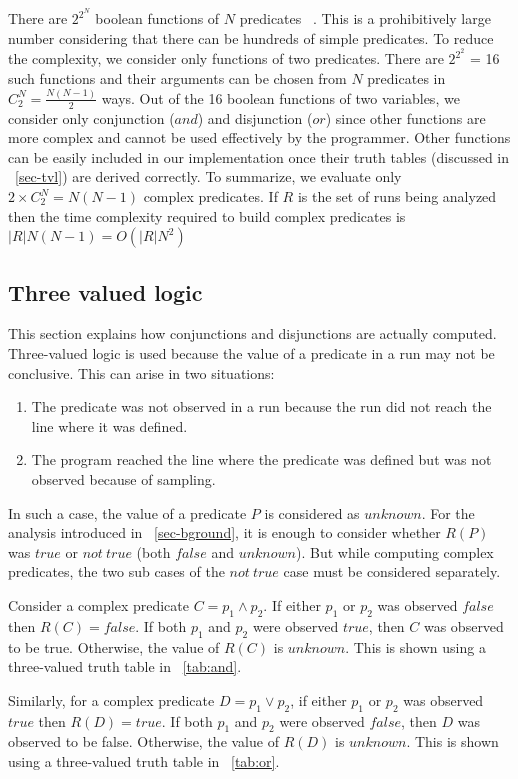 There are $2^{2^N}$ boolean functions of $N$ predicates ~\cite{MathWorld:BoolFuncs}.  This is a prohibitively large number considering that there can be hundreds of simple predicates.  To reduce the complexity, we consider only functions of two predicates.  There are $2^{2^2}$ = 16 such functions and their arguments can be chosen from $N$ predicates in $C^N_2 = \frac{N(N-1)}{2}$ ways.  Out of the 16 boolean functions of two variables, we consider only conjunction ($and$) and disjunction ($or$) since other functions are more complex and cannot be used effectively by the programmer.  Other functions can be easily included in our implementation once their truth tables (discussed in ~\autoref{sec-tvl}) are derived correctly.  To summarize, we evaluate only $2 \times C^N_2 = N(N-1)$ complex predicates.  If $R$ is the set of runs being analyzed then the time complexity required to build complex predicates is $|R|N(N-1) = O(|R|N^2)$

\subsection{Three valued logic}
\label{sec-tvl}
This section explains how conjunctions and disjunctions are actually computed.  Three-valued logic is used because the value of a predicate in a run may not be conclusive. This can arise in two situations:
\begin{enumerate}
\item The predicate was not observed in a run because the run did not reach the line where it was defined.
\item The program reached the line where the predicate was defined but was not observed because of sampling.
\end{enumerate}

In such a case, the value of a predicate $P$ is considered as $unknown$.  For the analysis introduced in ~\autoref{sec-bground}, it is enough to consider whether $R(P)$ was $true$ or $not\ true$ (both $false$ and $unknown$).  But while computing complex predicates, the two sub cases of the $not\ true$ case must be considered separately.

Consider a complex predicate $C = p_1 \wedge p_2$.  If either $p_1$ or $p_2$ was observed $false$ then $R(C) = false$.  If both $p_1$ and $p_2$ were observed $true$, then $C$ was observed to be true.  Otherwise, the value of $R(C)$ is $unknown$.  This is shown using a three-valued truth table in ~\autoref{tab:and}.

Similarly, for a complex predicate $D = p_1 \vee p_2$, if either $p_1$ or $p_2$ was observed $true$ then $R(D) = true$.  If both $p_1$ and $p_2$ were observed $false$, then $D$ was observed to be false.  Otherwise, the value of $R(D)$ is $unknown$.  This is shown using a three-valued truth table in ~\autoref{tab:or}.
 
